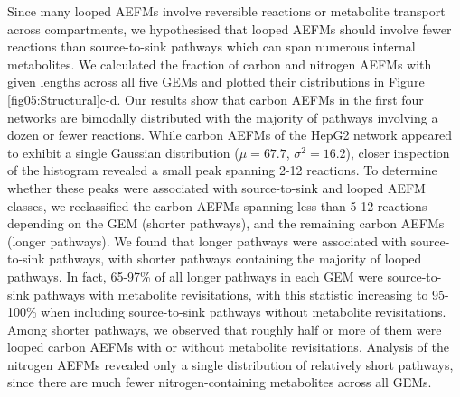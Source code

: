 \documentclass[12pt]{article}
\begin{document}
Since many looped AEFMs involve reversible reactions or metabolite
transport across compartments, we hypothesised that looped AEFMs should
involve fewer reactions than source-to-sink pathways which can span
numerous internal metabolites. We calculated the fraction of carbon and
nitrogen AEFMs with given lengths across all five GEMs and plotted their
distributions in Figure \ref{fig05:Structural}c-d. Our results show that
carbon AEFMs in the first four networks are bimodally distributed with the
majority of pathways involving a dozen or fewer reactions. While carbon
AEFMs of the HepG2 network appeared to exhibit a single Gaussian
distribution ($\mu=67.7$, $\sigma^2=16.2$), closer inspection of the
histogram revealed a small peak spanning 2-12 reactions. To determine
whether these peaks were associated with source-to-sink and looped AEFM
classes, we reclassified the carbon AEFMs spanning less than 5-12
reactions depending on the GEM (shorter pathways), and the remaining
carbon AEFMs (longer pathways). We found that longer pathways were
associated with source-to-sink pathways, with shorter pathways containing
the majority of looped pathways. In fact, 65-97\% of all longer pathways
in each GEM were source-to-sink pathways with metabolite revisitations,
with this statistic increasing to 95-100\% when including source-to-sink
pathways without metabolite revisitations. Among shorter pathways, we
observed that roughly half or more of them were looped carbon AEFMs with
or without metabolite revisitations. Analysis of the nitrogen AEFMs
revealed only a single distribution of relatively short pathways, since
there are much fewer nitrogen-containing metabolites across all GEMs.
\end{document}
